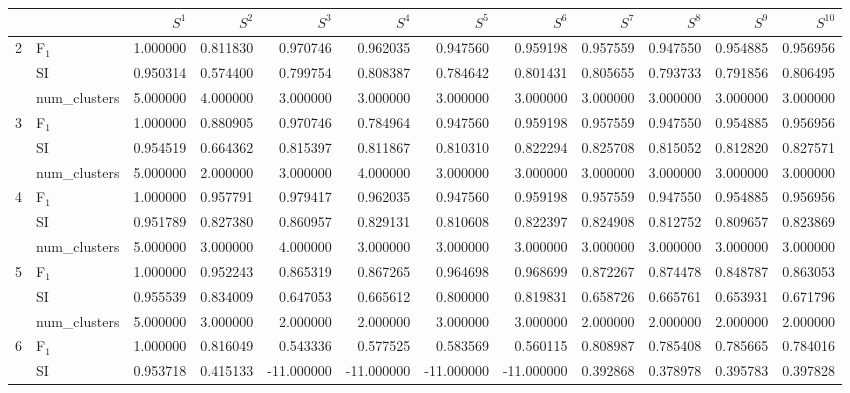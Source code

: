 \begin{tabular}{llrrrrrrrrrr}
\toprule
 &  & $S^{1}$ & $S^{2}$ & $S^{3}$ & $S^{4}$ & $S^{5}$ & $S^{6}$ & $S^{7}$ & $S^{8}$ & $S^{9}$ & $S^{10}$ \\
\midrule
\multirow[c]{3}{*}{2} & F$_1$ & 1.000000 & 0.811830 & 0.970746 & 0.962035 & 0.947560 & 0.959198 & 0.957559 & 0.947550 & 0.954885 & 0.956956 \\
 & SI & 0.950314 & 0.574400 & 0.799754 & 0.808387 & 0.784642 & 0.801431 & 0.805655 & 0.793733 & 0.791856 & 0.806495 \\
 & num_clusters & 5.000000 & 4.000000 & 3.000000 & 3.000000 & 3.000000 & 3.000000 & 3.000000 & 3.000000 & 3.000000 & 3.000000 \\
\multirow[c]{3}{*}{3} & F$_1$ & 1.000000 & 0.880905 & 0.970746 & 0.784964 & 0.947560 & 0.959198 & 0.957559 & 0.947550 & 0.954885 & 0.956956 \\
 & SI & 0.954519 & 0.664362 & 0.815397 & 0.811867 & 0.810310 & 0.822294 & 0.825708 & 0.815052 & 0.812820 & 0.827571 \\
 & num_clusters & 5.000000 & 2.000000 & 3.000000 & 4.000000 & 3.000000 & 3.000000 & 3.000000 & 3.000000 & 3.000000 & 3.000000 \\
\multirow[c]{3}{*}{4} & F$_1$ & 1.000000 & 0.957791 & 0.979417 & 0.962035 & 0.947560 & 0.959198 & 0.957559 & 0.947550 & 0.954885 & 0.956956 \\
 & SI & 0.951789 & 0.827380 & 0.860957 & 0.829131 & 0.810608 & 0.822397 & 0.824908 & 0.812752 & 0.809657 & 0.823869 \\
 & num_clusters & 5.000000 & 3.000000 & 4.000000 & 3.000000 & 3.000000 & 3.000000 & 3.000000 & 3.000000 & 3.000000 & 3.000000 \\
\multirow[c]{3}{*}{5} & F$_1$ & 1.000000 & 0.952243 & 0.865319 & 0.867265 & 0.964698 & 0.968699 & 0.872267 & 0.874478 & 0.848787 & 0.863053 \\
 & SI & 0.955539 & 0.834009 & 0.647053 & 0.665612 & 0.800000 & 0.819831 & 0.658726 & 0.665761 & 0.653931 & 0.671796 \\
 & num_clusters & 5.000000 & 3.000000 & 2.000000 & 2.000000 & 3.000000 & 3.000000 & 2.000000 & 2.000000 & 2.000000 & 2.000000 \\
\multirow[c]{3}{*}{6} & F$_1$ & 1.000000 & 0.816049 & 0.543336 & 0.577525 & 0.583569 & 0.560115 & 0.808987 & 0.785408 & 0.785665 & 0.784016 \\
 & SI & 0.953718 & 0.415133 & -11.000000 & -11.000000 & -11.000000 & -11.000000 & 0.392868 & 0.378978 & 0.395783 & 0.397828 \\

\end{tabular}
